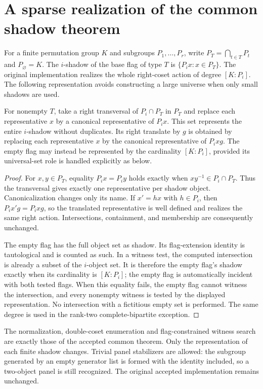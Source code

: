 \section{A sparse realization of the common shadow theorem}
For a finite permutation group $K$ and subgroups $P_1,\ldots,P_r$, write
$P_T=\bigcap_{t\in T}P_t$ and $P_\varnothing=K$. The $i$-shadow of the
base flag of type $T$ is $\{P_i x:x\in P_T\}$. The original implementation
realizes the whole right-coset action of degree $[K:P_i]$. The following
representation avoids constructing a large universe when only small
shadows are used.
\begin{proposition}
For nonempty $T$, take a right transversal of $P_i\cap P_T$ in $P_T$ and
replace each representative $x$ by a canonical representative of $P_i x$.
This set represents the entire $i$-shadow without duplicates. Its right
translate by $g$ is obtained by replacing each representative $x$ by the
canonical representative of $P_i xg$. The empty flag may instead be
represented by the cardinality $[K:P_i]$, provided its universal-set role
is handled explicitly as below.
\end{proposition}
\begin{proof}
For $x,y\in P_T$, equality $P_i x=P_i y$ holds exactly when
$xy^{-1}\in P_i\cap P_T$. Thus the transversal gives exactly one
representative per shadow object. Canonicalization changes only its name.
If $x'=hx$ with $h\in P_i$, then $P_i x'g=P_i xg$, so the translated
representative is well defined and realizes the same right action.
Intersections, containment, and membership are consequently unchanged.

The empty flag has the full object set as shadow. Its flag-extension
identity is tautological and is counted as such. In a witness test, the
computed intersection is already a subset of the $i$-object set. It is
therefore the empty flag's shadow exactly when its cardinality is
$[K:P_i]$; the empty flag is automatically incident with both tested flags.
When this equality fails, the empty flag cannot witness the intersection,
and every nonempty witness is tested by the displayed representation.
No intersection with a fictitious empty set is performed. The same degree
is used in the rank-two complete-bipartite exception.
\end{proof}
The normalization, double-coset enumeration and flag-constrained witness
search are exactly those of the accepted common theorem. Only the
representation of each finite shadow changes. Trivial panel stabilizers
are allowed: the subgroup generated by an empty generator list is formed
with the identity included, so a two-object panel is still recognized.
The original accepted implementation remains unchanged.


